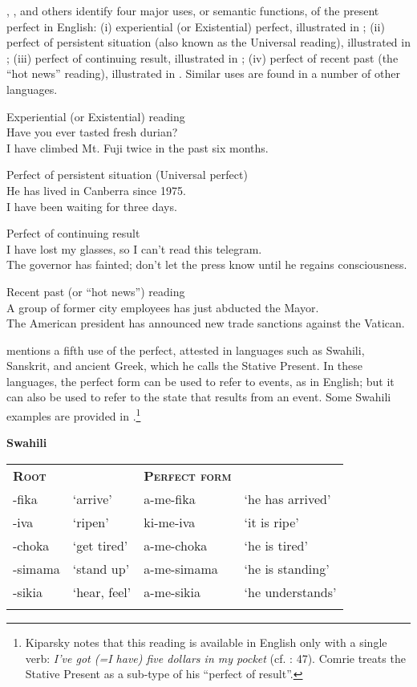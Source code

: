 \citet{McCawley1971}, \citet{Comrie1976}, and others identify four major uses, or semantic functions, of the present perfect in English: (i) experiential (or Existential) perfect, illustrated in ; (ii) perfect of persistent situation (also known as the Universal reading), illustrated in ; (iii) perfect of continuing result, illustrated in ; (iv) perfect of recent past (the “hot news” reading), illustrated in . Similar uses are found in a number of other languages.


\ea
Experiential (or Existential) reading\\
\ea Have you ever tasted fresh durian?\\
\ex I have climbed Mt. Fuji twice in the past six months.
                       \z
\z

\ea
Perfect of persistent situation (Universal perfect)\\
\ea He has lived in Canberra since 1975.\\
\ex I have been waiting for three days.
                       \z
\z

\ea
Perfect of continuing result\\
\ea I have lost my glasses, so I can’t read this telegram.\\
\ex The governor has fainted; don’t let the press know until he regains consciousness.
                       \z
\z

\ea
Recent past (or “hot news”) reading\\
\ea A group of former city employees has just abducted the Mayor.\\
\ex The American president has announced new trade sanctions against the Vatican.
                       \z
\z


\citet{Kiparsky2002} mentions a fifth use of the perfect, attested in languages such as Swahili, Sanskrit, and ancient Greek, which he calls the Stative Present. In these languages, the perfect form can be used to refer to events, as in English; but it can also be used to refer to the state that results from an event. Some Swahili examples are provided in .\footnote{Kiparsky notes that this reading is available in English only with a single verb: \textit{I’ve got (=I have) five dollars in my pocket} (cf. \citealt{Jesperson1931}: 47). Comrie treats the Stative Present as a sub-type of his “perfect of result”.}


\ea
\textbf{Swahili} \citet{Ashton1944}
\z

\begin{tabularx}{\textwidth}{XXXX}
\lsptoprule
\bfseries\scshape Root &  & \bfseries\scshape Perfect form & \\
-fika & ‘arrive’ & a-me-fika & ‘he has arrived’\\
-iva & ‘ripen’ & ki-me-iva & ‘it is ripe’\\
-choka & ‘get tired’ & a-me-choka & ‘he is tired’\\
-simama & ‘stand up’ & a-me-simama & ‘he is standing’\\
-sikia & ‘hear, feel’ & a-me-sikia & ‘he understands’\\
\lspbottomrule
\end{tabularx}

